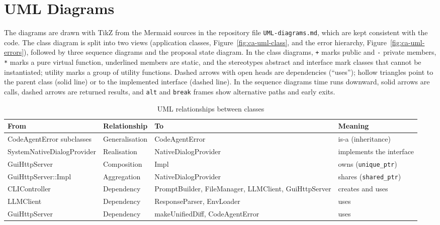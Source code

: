 \documentclass[12pt,a4paper,oneside]{book}
\begin{document}
\section{UML Diagrams}
\label{sec:ca-uml}

The diagrams are drawn with TikZ from the Mermaid sources in the repository
file \texttt{UML-diagrams.md}, which are kept consistent with the code. The class diagram is split into two
views (application classes, Figure~\ref{fig:ca-uml-class}, and the error
hierarchy, Figure~\ref{fig:ca-uml-errors}), followed by three sequence
diagrams and the proposal state diagram.
In the class diagrams, \texttt{+} marks public and \texttt{-} private
members, \texttt{*} marks a pure virtual function, underlined members are
static, and the stereotypes \guillemotleft abstract\guillemotright{} and
\guillemotleft interface\guillemotright{} mark classes that cannot be
instantiated; \guillemotleft utility\guillemotright{} marks a group of utility
functions. Dashed arrows with open heads are dependencies (``uses''); hollow
triangles point to the parent class (solid line) or to the implemented
interface (dashed line). In the sequence diagrams time runs downward, solid
arrows are calls, dashed arrows are returned results, and \texttt{alt} and
\texttt{break} frames show alternative paths and early exits.

\begin{table}[htbp]
\centering\small
\begin{tabular}{|p{3.6cm}|p{2.6cm}|p{3.6cm}|p{4.0cm}|}
\hline
\textbf{From} & \textbf{Relationship} & \textbf{To} & \textbf{Meaning} \\ \hline
CodeAgentError subclasses & Generalisation & CodeAgentError & is-a (inheritance) \\ \hline
SystemNative\allowbreak DialogProvider & Realisation & NativeDialogProvider & implements the interface \\ \hline
GuiHttpServer & Composition & Impl & owns (\texttt{unique\_ptr}) \\ \hline
GuiHttpServer::Impl & Aggregation & NativeDialogProvider & shares (\texttt{shared\_ptr}) \\ \hline
CLIController & Dependency & PromptBuilder, FileManager, LLMClient, GuiHttpServer & creates and uses \\ \hline
LLMClient & Dependency & ResponseParser, EnvLoader & uses \\ \hline
GuiHttpServer & Dependency & makeUnifiedDiff, CodeAgentError & uses \\ \hline
\end{tabular}
\caption{UML relationships between classes}
\label{tab:ca-uml-rel}
\end{table}
\end{document}
